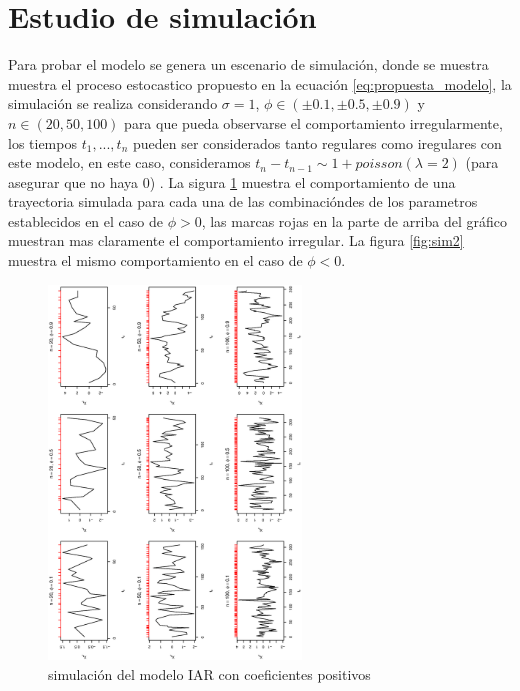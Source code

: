 \section{Estudio de simulación}
Para probar el modelo se genera un escenario de simulación, donde se muestra muestra el proceso estocastico propuesto
en la ecuación \ref{eq:propuesta_modelo}, la simulación se realiza considerando $\sigma = 1$, $\phi \in (\pm 0.1 ,\pm 0.5,\pm 0.9)$ y $n \in (20, 50, 100)$ para que pueda
observarse el comportamiento irregularmente, los tiempos $t_1 , ... , t_n$ pueden ser considerados tanto regulares como iregulares con este modelo, en este caso, consideramos
$t_n - t_{n-1} \sim 1 + poisson(\lambda = 2)$ (para asegurar que no haya 0) . La sigura \ref{fig:sim1} muestra el comportamiento
de una trayectoria simulada para cada una de las combinacióndes de los parametros establecidos en el caso de $\phi > 0$, las marcas rojas en la parte de arriba del gráfico
muestran mas claramente el comportamiento irregular. La figura \ref{fig:sim2} muestra el mismo comportamiento en el caso de $\phi < 0$.
\begin{figure}[h]
    \includegraphics[width=0.6\textwidth, angle = 270]{Kap3/Fig_Cap3/sim1.eps}
    \caption{simulación del modelo IAR con coeficientes positivos}
    \label{fig:sim1}
\end{figure}


